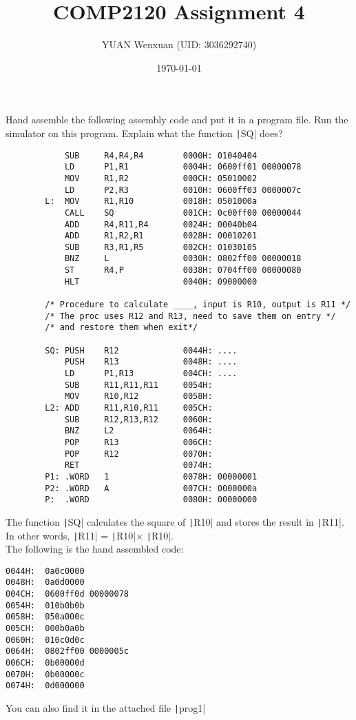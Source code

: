 \documentclass[answers]{exam}
\title{COMP2120 Assignment 4}
\author{YUAN Wenxuan (UID: 3036292740)}
\date{\today}
\begin{document}
\maketitle

\begin{questions}
    \question Hand assemble the following assembly code and put it in a program file. Run the simulator on this program. Explain what the function \texttt|SQ| does?
    \begin{listing}[htb]
        \begin{verbatim}
            SUB     R4,R4,R4        0000H: 01040404
            LD      P1,R1           0004H: 0600ff01 00000078
            MOV     R1,R2           000CH: 05010002
            LD      P2,R3           0010H: 0600ff03 0000007c
        L:  MOV     R1,R10          0018H: 0501000a
            CALL    SQ              001CH: 0c00ff00 00000044
            ADD     R4,R11,R4       0024H: 00040b04
            ADD     R1,R2,R1        0028H: 00010201
            SUB     R3,R1,R5        002CH: 01030105
            BNZ     L               0030H: 0802ff00 00000018
            ST      R4,P            0038H: 0704ff00 00000080
            HLT                     0040H: 09000000
        
        /* Procedure to calculate ____, input is R10, output is R11 */
        /* The proc uses R12 and R13, need to save them on entry */
        /* and restore them when exit*/
        
        SQ: PUSH    R12             0044H: ....
            PUSH    R13             0048H: ....
            LD      P1,R13          004CH: ....
            SUB     R11,R11,R11     0054H:
            MOV     R10,R12         0058H:
        L2: ADD     R11,R10,R11     005CH:
            SUB     R12,R13,R12     0060H:
            BNZ     L2              0064H:
            POP     R13             006CH:
            POP     R12             0070H:
            RET                     0074H:
        P1: .WORD   1               0078H: 00000001
        P2: .WORD   A               007CH: 0000000a
        P:  .WORD                   0080H: 00000000
        \end{verbatim}
    \end{listing}

    \pagebreak
    \begin{solution}
        The function \texttt|SQ| calculates the square of \texttt|R10| and stores the result in \texttt|R11|. \\
        In other words, \texttt|R11| = \texttt|R10|$\times$ \texttt|R10|. \\
        The following is the hand assembled code:
        \begin{verbatim}
0044H:  0a0c0000
0048H:  0a0d0000
004CH:  0600ff0d 00000078
0054H:  010b0b0b
0058H:  050a000c
005CH:  000b0a0b
0060H:  010c0d0c
0064H:  0802ff00 0000005c
006CH:  0b00000d
0070H:  0b00000c
0074H:  0d000000
        \end{verbatim}
        You can also find it in the attached file \texttt|prog1|
    \end{solution}



\end{questions}
\end{document}
